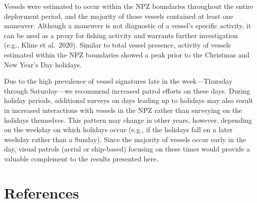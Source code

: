 \documentclass[
  letterpaper,
  oneside,
  open=any]{scrbook}
\begin{document}
Vessels were estimated to occur within the NPZ boundaries throughout the
entire deployment period, and the majority of those vessels contained at
least one maneuver. Although a maneuver is not diagnostic of a vessel's
specific activity, it can be used as a proxy for fishing activity and
warrants further investigation (e.g., Kline et al.~2020). Similar to
total vessel presence, activity of vessels estimated within the NPZ
boundaries showed a peak prior to the Christmas and New Year's Day
holidays.

Due to the high prevalence of vessel signatures late in the
week---Thursday through Saturday---we recommend increased patrol efforts
on these days. During holiday periods, additional surveys on days
leading up to holidays may also result in increased interactions with
vessels in the NPZ rather than surveying on the holidays themselves.
This pattern may change in other years, however, depending on the
weekday on which holidays occur (e.g., if the holidays fall on a later
weekday rather than a Sunday). Since the majority of vessels occur early
in the day, visual patrols (aerial or ship-based) focusing on these
times would provide a valuable complement to the results presented here.


\chapter*{References}\label{references}


\printbibliography[heading=none]


\backmatter
\end{document}
